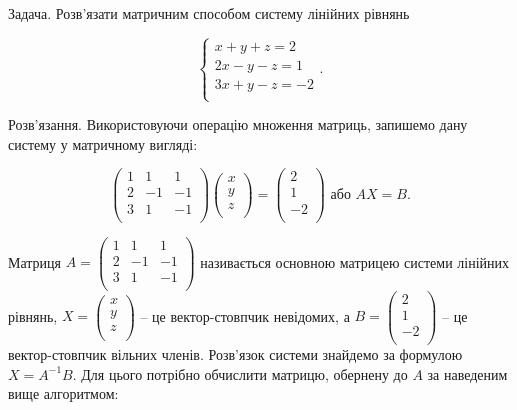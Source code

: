 Задача. Розв’язати матричним способом систему лінійних рівнянь

$$\left\{ \begin{matrix}
	x + y + z = 2 \\
	2x - y - z = 1 \\
	3x + y - z = -2 \\
\end{matrix} \right..$$

Розв’язання. Використовуючи операцію множення матриць, запишемо дану
систему у матричному вигляді:

$$\begin{pmatrix}
	1 & 1  & 1  \\
	2 & -1 & -1 \\
	3 & 1  & -1 \\
\end{pmatrix} \begin{pmatrix}
	x \\
	y \\
	z \\
\end{pmatrix}
= \begin{pmatrix}
	2 \\
	1 \\
	-2 \\
\end{pmatrix} \text{ або } AX = B.$$

Матриця $A = \begin{pmatrix}
	1 & 1  & 1  \\
	2 & -1 & -1 \\
	3 & 1  & -1 \\
\end{pmatrix} $ називається основною матрицею системи
лінійних рівнянь, $X = \begin{pmatrix}
	x \\
	y \\
	z \\
\end{pmatrix}$ -- це вектор-стовпчик невідомих, а $B = \begin{pmatrix}
	2 \\
	1 \\
	-2 \\
\end{pmatrix}$ -- це
вектор-стовпчик вільних членів. Розв’язок системи знайдемо за формулою
$X = A^{-1} B$. Для цього потрібно обчислити матрицю, обернену до $A$ за наведеним
вище алгоритмом:

